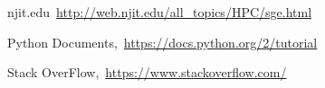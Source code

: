 \cleardoublepage
{}
{}
\begin{thebibliography}{99}

njit.edu\ \url{http://web.njit.edu/all_topics/HPC/sge.html}

Python Documents,\ \url{https://docs.python.org/2/tutorial}

Stack OverFlow,\ \url{https://www.stackoverflow.com/}
\end{thebibliography}
